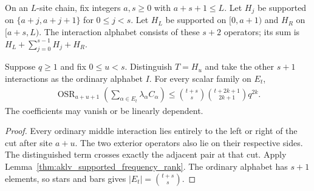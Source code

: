 \begin{definition}
    \label{def:aklv_window_alphabet}
    \leanok
    On an $L$-site chain, fix integers $a,s\ge0$ with $a+s+1\le L$.
    Let $H_j$ be supported on $\{a+j,a+j+1\}$ for $0\le j<s$.
    Let $H_L$ be supported on ${\lbrack 0,a+1)}$ and $H_R$ on ${\lbrack a+s,L)}$.
    The interaction alphabet consists of these $s+2$ operators; its sum is
    $H_L+\sum_{j=0}^{s-1}H_j+H_R$.
\end{definition}

\begin{lemma}
    \label{thm:aklv_window_frequency_rank}
    \leanok
    Suppose $q\ge1$ and fix $0\le u<s$. Distinguish $T=H_u$ and take the
    other $s+1$ interactions as the ordinary alphabet $I$.
    For every scalar family on $E_t$,
    \begin{align*}
        \operatorname{OSR}_{a+u+1}\!\left(
        \sum_{\alpha\in E_t}\lambda_\alpha C_\alpha\right)
        \le \binom{t+s}{s}\binom{t+2k+1}{2k+1}q^{2k}.
    \end{align*}
    The coefficients may vanish or be linearly dependent.
\end{lemma}
\begin{proof}
    \leanok
    Every ordinary middle interaction lies entirely to the left or right of
    the cut after site $a+u$. The two exterior operators also lie on their
    respective sides. The distinguished term crosses exactly the adjacent
    pair at that cut. Apply Lemma~\ref{thm:aklv_supported_frequency_rank}.
    The ordinary alphabet has $s+1$ elements, so stars and bars gives
    $|E_t|=\binom{t+s}{s}$.
\end{proof}

